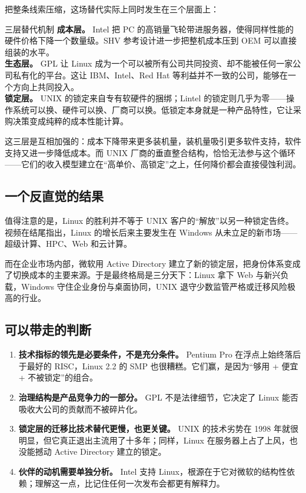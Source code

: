 \documentclass[a4paper]{article}
\begin{document}
把整条线索压缩，这场替代实际上同时发生在三个层面上：

\begin{importantbox}{三层替代机制}
\textbf{成本层。} Intel 把 PC 的高销量飞轮带进服务器，使得同样性能的硬件价格下降一个数量级。SHV 参考设计进一步把整机成本压到 OEM 可以直接组装的水平。\\
\textbf{生态层。} GPL 让 Linux 成为一个可以被所有公司共同投资、却不能被任何一家公司私有化的平台。这让 IBM、Intel、Red Hat 等利益并不一致的公司，能够在一个方向上共同投入。\\
\textbf{锁定层。} UNIX 的锁定来自专有软硬件的捆绑；Lintel 的锁定则几乎为零——操作系统可以换、硬件可以换、厂商可以换。低锁定本身就是一种产品特性，它让采购决策变成纯粹的成本性能计算。\\
\end{importantbox}

这三层是互相加强的：成本下降带来更多装机量，装机量吸引更多软件支持，软件支持又进一步降低成本。而 UNIX 厂商的垂直整合结构，恰恰无法参与这个循环——它们的收入模型建立在“高单价、高锁定”之上，任何降价都会直接侵蚀利润。

\subsection{一个反直觉的结果}

值得注意的是，Linux 的胜利并不等于 UNIX 客户的“解放”以另一种锁定告终。视频在结尾指出，Linux 的增长后来主要发生在 Windows 从未立足的新市场——超级计算、HPC、Web 和云计算。

而在企业市场内部，微软用 Active Directory 建立了新的锁定层，把身份体系变成了切换成本的主要来源。于是最终格局是三分天下：Linux 拿下 Web 与新兴负载，Windows 守住企业身份与桌面协同，UNIX 退守少数监管严格或迁移风险极高的行业。

\subsection{可以带走的判断}

\begin{enumerate}
\item \textbf{技术指标的领先是必要条件，不是充分条件。} Pentium Pro 在浮点上始终落后于最好的 RISC，Linux 2.2 的 SMP 也很糟糕。它们赢，是因为“够用 + 便宜 + 不被锁定”的组合。
\item \textbf{治理结构是产品竞争力的一部分。} GPL 不是法律细节，它决定了 Linux 能否吸收大公司的贡献而不被碎片化。
\item \textbf{锁定层的迁移比技术替代更慢，也更关键。} UNIX 的技术劣势在 1998 年就很明显，但它真正退出主流用了十多年；同样，Linux 在服务器上占了上风，也没能撼动 Active Directory 建立的锁定。
\item \textbf{伙伴的动机需要单独分析。} Intel 支持 Linux，根源在于它对微软的结构性依赖；理解这一点，比记住任何一次发布会都更有解释力。
\end{enumerate}
\end{document}
